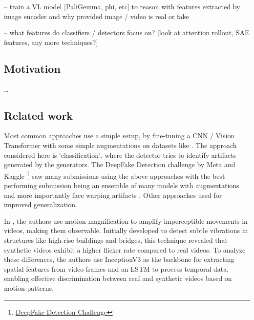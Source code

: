 \documentclass[10pt,twocolumn,letterpaper]{article}
\begin{document}
-- train a VL model [PaliGemma, phi, etc] to reason with features extracted by image encoder and why provided image / video is real or fake

-- what features do classifiers / detectors focus on? [look at attention rollout, SAE features, any more techniques?]

\subsection{Motivation}
\ldots

\subsection{Related work}
Most common approaches use a simple setup, by fine-tuning a CNN / Vision Transformer \cite{dosovitskiyImageWorth16x162021} with some simple augmentations on datasets like \cite{dolhanskyDeepFakeDetectionChallenge2020, rosslerFaceForensicsLargescaleVideo2018, zhengBreakingSemanticArtifacts2024, liCelebDFLargeScaleChallenging2020}. The approach considered here is `classification', where the detector tries to identify artifacts generated by the generators. The DeepFake Detection challenge by Meta and Kaggle \footnote{\href{https://ai.meta.com/datasets/dfdc/}{DeepFake Detection Challenge}} saw many submissions using the above approaches with the best performing submission \cite{seferbekovDeepfakeDetectionChallenge} being an ensemble of many models with augmentations and more importantly face warping artifacts \cite{liExposingDeepFakeVideos2019}. Other approaches used \cite{yunCutMixRegularizationStrategy2019a, hendrycks*AugMixSimpleData2019, zhangMixupEmpiricalRisk2018a} for improved generalization.

In \cite{feiExposingAIgeneratedVideos2021}, the authors use motion magnification to amplify imperceptible movements in videos, making them observable. Initially developed to detect subtle vibrations in structures like high-rise buildings and bridges, this technique revealed that synthetic videos exhibit a higher flicker rate compared to real videos. To analyze these differences, the authors use InceptionV3 \cite{szegedyRethinkingInceptionArchitecture2015} as the backbone for extracting spatial features from video frames and an LSTM \cite{hochreiterLongShortTermMemory1997} to process temporal data, enabling effective discrimination between real and synthetic videos based on motion patterns.
\end{document}
